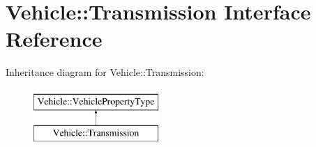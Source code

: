 \hypertarget{interfaceVehicle_1_1Transmission}{\section{Vehicle\-:\-:Transmission Interface Reference}
\label{interfaceVehicle_1_1Transmission}
}
Inheritance diagram for Vehicle\-:\-:Transmission\-:\begin{figure}[H]
\begin{center}
\leavevmode
\includegraphics[height=2.000000cm]{interfaceVehicle_1_1Transmission}
\end{center}
\end{figure}
